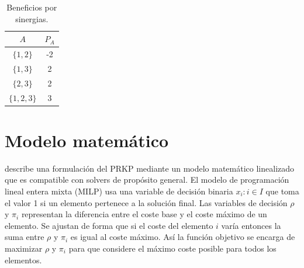 \documentclass[spanish, a4paper, 12pt, openany,final]{book}
\begin{document}
	\begin{table}[H]
		\centering
		\caption{Beneficios por sinergias.}
		\label{tab:sinergias}
		\begin{tabular}{|c|c|}
			\hline
			$A$    & $P_A$\\
			\hline
			$\{1,2\}$ & -2 \\
			\hline
			$\{1,3\}$ & 2 \\
			\hline
			$\{2,3\}$ & 2\\
			\hline
			$\{1,2,3\}$ & 3\\
			\hline
		\end{tabular}
	\end{table}
	

		

	
    
    \section{Modelo matemático}
    
    
    \cite{baldo_polynomial_2023} describe una formulación del PRKP mediante un modelo matemático linealizado que es compatible con solvers de propósito general. El modelo de programación lineal entera mixta (MILP) usa una variable de decisión binaria $x_i: i \in I$ que toma el valor 1 si un elemento pertenece a la solución final. Las variables de decisión $\rho$ y $\pi_i$ representan la diferencia entre el coste base y el coste máximo de un elemento. Se ajustan de forma que si el coste del elemento $i$ varía entonces la suma entre $\rho$ y $\pi_i$ es igual al coste máximo. Así la función objetivo se encarga de maximizar $\rho$ y $\pi_i$ para que considere el máximo coste posible para todos los elementos.
        
\end{document}

